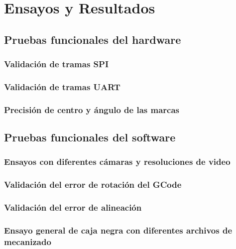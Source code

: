 \chapter{Ensayos y Resultados} %
\label{Chapter4}

\section{Pruebas funcionales del hardware}
\label{sec:pruebasHW}

\subsection{Validación de tramas SPI}
\subsection{Validación de tramas UART}
\subsection{Precisión de centro y ángulo de las marcas}

\section{Pruebas funcionales del software}
\subsection{Ensayos con diferentes cámaras y resoluciones de video}
\subsection{Validación del error de rotación del GCode}
\subsection{Validación del error de alineación}
\subsection{Ensayo general de caja negra con diferentes archivos de mecanizado}

